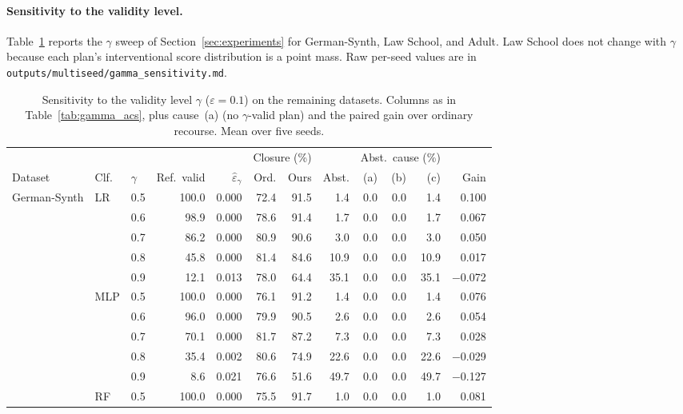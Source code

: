 \paragraph{Sensitivity to the validity level.}
Table~\ref{tab:gamma_all} reports the $\gamma$ sweep of
Section~\ref{sec:experiments} for German-Synth, Law School, and Adult. Law
School does not change with $\gamma$ because each plan's interventional score
distribution is a point mass. Raw per-seed values are in
\texttt{outputs/multiseed/gamma\_sensitivity.md}.

\begin{table}[t]
\centering
\small
\caption{Sensitivity to the validity level $\gamma$ ($\varepsilon=0.1$) on the
remaining datasets. Columns as in Table~\ref{tab:gamma_acs}, plus cause~(a)
(no $\gamma$-valid plan) and the paired gain over ordinary recourse. Mean over
five seeds.}
\label{tab:gamma_all}
\setlength{\tabcolsep}{3.5pt}
\begin{tabular}{lllrrrrrrrrr}
\hline
& & & & & \multicolumn{2}{c}{Closure (\%)} & & \multicolumn{3}{c}{Abst.\ cause (\%)} & \\
Dataset & Clf. & $\gamma$ & Ref.\ valid & $\hat\varepsilon_\gamma$ & Ord. & Ours & Abst. & (a) & (b) & (c) & Gain \\
\hline
German-Synth & LR & 0.5 & 100.0 & 0.000 & 72.4 & 91.5 & 1.4 & 0.0 & 0.0 & 1.4 & 0.100 \\
 &  & 0.6 & 98.9 & 0.000 & 78.6 & 91.4 & 1.7 & 0.0 & 0.0 & 1.7 & 0.067 \\
 &  & 0.7 & 86.2 & 0.000 & 80.9 & 90.6 & 3.0 & 0.0 & 0.0 & 3.0 & 0.050 \\
 &  & 0.8 & 45.8 & 0.000 & 81.4 & 84.6 & 10.9 & 0.0 & 0.0 & 10.9 & 0.017 \\
 &  & 0.9 & 12.1 & 0.013 & 78.0 & 64.4 & 35.1 & 0.0 & 0.0 & 35.1 & $-$0.072 \\
\cline{2-12}
 & MLP & 0.5 & 100.0 & 0.000 & 76.1 & 91.2 & 1.4 & 0.0 & 0.0 & 1.4 & 0.076 \\
 &  & 0.6 & 96.0 & 0.000 & 79.9 & 90.5 & 2.6 & 0.0 & 0.0 & 2.6 & 0.054 \\
 &  & 0.7 & 70.1 & 0.000 & 81.7 & 87.2 & 7.3 & 0.0 & 0.0 & 7.3 & 0.028 \\
 &  & 0.8 & 35.4 & 0.002 & 80.6 & 74.9 & 22.6 & 0.0 & 0.0 & 22.6 & $-$0.029 \\
 &  & 0.9 & 8.6 & 0.021 & 76.6 & 51.6 & 49.7 & 0.0 & 0.0 & 49.7 & $-$0.127 \\
\cline{2-12}
 & RF & 0.5 & 100.0 & 0.000 & 75.5 & 91.7 & 1.0 & 0.0 & 0.0 & 1.0 & 0.081 \\

\end{tabular}
\end{table}
